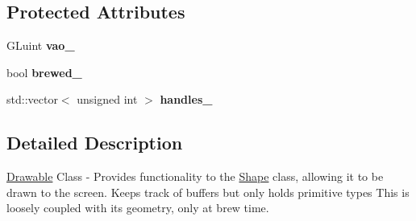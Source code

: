 \subsection*{Protected Attributes}
\begin{DoxyCompactItemize}
\item 
\hypertarget{classs9_1_1gl_1_1Drawable_af6cf679ad222fb978916db2d2123b6ad}{G\-Luint {\bfseries vao\-\_\-}}\label{classs9_1_1gl_1_1Drawable_af6cf679ad222fb978916db2d2123b6ad}

\item 
\hypertarget{classs9_1_1gl_1_1Drawable_a04bf33540b7563416be85ee48322f9db}{bool {\bfseries brewed\-\_\-}}\label{classs9_1_1gl_1_1Drawable_a04bf33540b7563416be85ee48322f9db}

\item 
\hypertarget{classs9_1_1gl_1_1Drawable_a8fb7244c60f78807837526c482e8965b}{std\-::vector$<$ unsigned int $>$ {\bfseries handles\-\_\-}}\label{classs9_1_1gl_1_1Drawable_a8fb7244c60f78807837526c482e8965b}

\end{DoxyCompactItemize}


\subsection{Detailed Description}
\hyperlink{classs9_1_1gl_1_1Drawable}{Drawable} Class -\/ Provides functionality to the \hyperlink{classs9_1_1Shape}{Shape} class, allowing it to be drawn to the screen. Keeps track of buffers but only holds primitive types This is loosely coupled with its geometry, only at brew time. 

